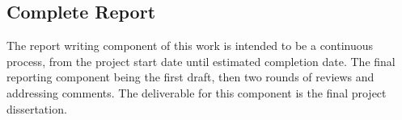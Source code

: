 \subsection{Complete Report}

The report writing component of this work is intended to be a continuous process, from the project start date until estimated completion date. 
The final reporting component being the first draft, then two rounds of reviews and addressing comments. The deliverable for this component is the final project dissertation. 
